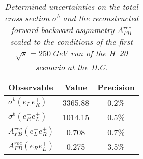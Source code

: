         \begin{table}
        \begin{center}
        \begin{tabular}{l c c}
        \hline
	Observable & Value & Precision \\
	\hline
	$\sigma^b (e^-_Le^+_R)$ & 3365.88 & 0.2\% \\
	$\sigma^b (e^-_Re^+_L)$ & 1014.15 & 0.5\% \\
	$A_{FB}^{rec} (e^-_Le^+_R)$& 0.708 & 0.7\% \\
	$A_{FB}^{rec} (e^-_Re^+_L)$ & 0.275 & 3.5\% \\
        \hline
        \end{tabular}
        \end{center}
        \caption{\sl Determined uncertainties on the total cross section $\sigma^b$ and the reconstructed forward-backward asymmetry $A_{FB}^{rec}$ scaled to the conditions of the first $\sqrt{s}=250$\,GeV run of the H~20 scenario at the ILC. }
        \label{table:bbbarfinal}
        \end{table}
